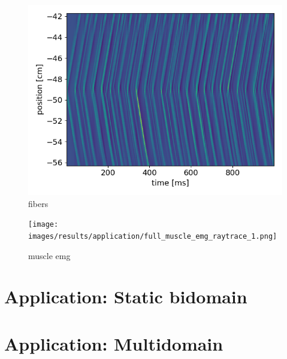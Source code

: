 \begin{figure}[H]
  \centering%
  \includegraphics[width=\textwidth]{images/results/application/fibers_plot.png}%
  \caption{fibers}%
  \label{fig:fibers_plot}%
\end{figure}

\begin{figure}[H]
  \centering%
  \texttt{[image: images/results/application/full\_muscle\_emg\_raytrace\_1.png]}%
  \caption{muscle emg}%
  \label{fig:full_muscle_emg_raytrace_1}%
\end{figure}


\section{Application: Static bidomain}
\section{Application: Multidomain}


